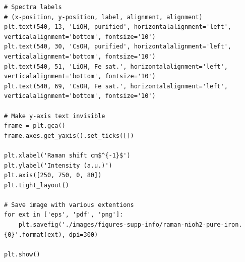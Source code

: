 \documentclass[journal=jpccck,manuscript=suppinfo,email=true]{achemso}
\begin{document}
\begin{verbatim}
# Spectra labels
# (x-position, y-position, label, alignment, alignment)
plt.text(540, 13, 'LiOH, purified', horizontalalignment='left', verticalalignment='bottom', fontsize='10')
plt.text(540, 30, 'CsOH, purified', horizontalalignment='left', verticalalignment='bottom', fontsize='10')
plt.text(540, 51, 'LiOH, Fe sat.', horizontalalignment='left', verticalalignment='bottom', fontsize='10')
plt.text(540, 69, 'CsOH, Fe sat.', horizontalalignment='left', verticalalignment='bottom', fontsize='10')

# Make y-axis text invisible
frame = plt.gca()
frame.axes.get_yaxis().set_ticks([])

plt.xlabel('Raman shift cm$^{-1}$')
plt.ylabel('Intensity (a.u.)')
plt.axis([250, 750, 0, 80])
plt.tight_layout()

# Save image with various extentions
for ext in ['eps', 'pdf', 'png']:
    plt.savefig('./images/figures-supp-info/raman-nioh2-pure-iron.{0}'.format(ext), dpi=300)

plt.show()
\end{verbatim}
\end{document}
